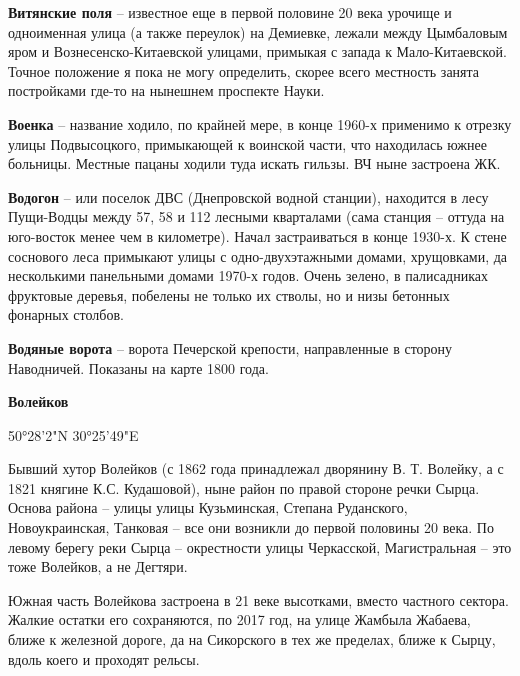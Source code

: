 \medskip

\textbf{Витянские поля} – известное еще в первой половине 20 века урочище и одноименная улица (а также переулок) на Демиевке, лежали между Цымбаловым яром и Вознесенско-Китаевской улицами, примыкая с запада к Ма\-ло-Китаевской. Точное положение я пока не могу определить, скорее всего местность занята постройками где-то на нынешнем проспекте Науки.\\

\medskip

\textbf{Военка} – название ходило, по крайней мере, в конце 1960-х применимо к отрезку улицы Подвысоцкого, примыкающей к воинской части, что находилась южнее больницы. Местные пацаны ходили туда искать гильзы. ВЧ ныне застроена ЖК.\\ 

\medskip

\textbf{Водогон} – или поселок ДВС (Днепровской водной станции), находится в лесу Пущи-Вод\-цы между 57, 58 и 112 лесными кварталами (сама станция – оттуда на юго-восток менее чем в километре). Начал застраиваться в конце 1930-х. К стене соснового леса примыкают улицы с одно-двухэтажными домами, хрущовками, да несколькими панельными домами 1970-х годов. Очень зелено, в палисадниках фруктовые деревья, побелены не только их стволы, но и низы бетонных фонарных столбов.\\

\medskip

\textbf{Водяные ворота} – ворота Печерской крепости, направленные в сторону Наводничей. Показаны на карте 1800 года.\\

\medskip

\textbf{Волейков}

50°28'2"N 30°25'49"E

Бывший хутор Волейков (с 1862 года принадлежал дворянину В. Т. Волейку, а с 1821 княгине К.С. Кудашовой), ныне район по правой стороне речки Сырца. Основа района – улицы улицы Кузьминская, Степана Руданского, Новоукраинская, Танковая – все они возникли до первой половины 20 века. По левому берегу реки Сырца – окрестности улицы Черкасской, Магистральная – это тоже Волейков, а не Дегтяри.

Южная часть Волейкова застроена в 21 веке высотками, вместо частного сектора. Жалкие остатки его сохраняются, по 2017 год, на улице Жамбыла Жабаева, ближе к железной дороге, да на Сикорского в тех же пределах, ближе к Сырцу, вдоль коего и проходят рельсы.\\

